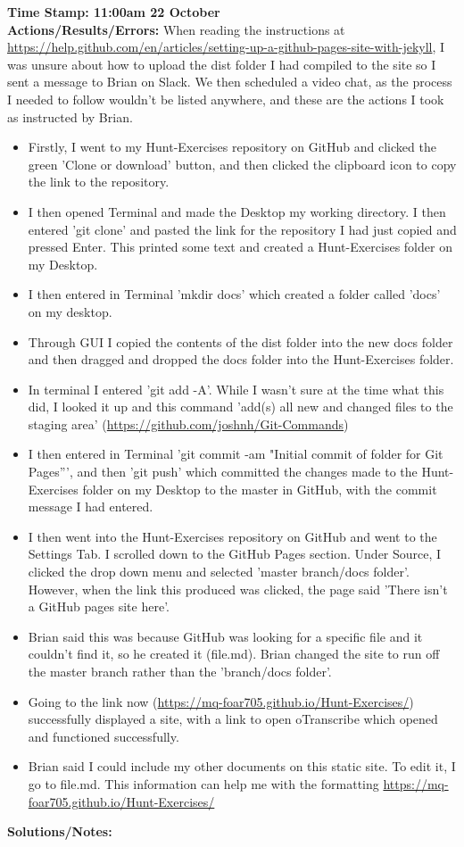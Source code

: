\documentclass{article}
\begin{document}
\begin{FlushLeft}
\textbf{Time Stamp: 11:00am 22 October} \\
\textbf{Actions/Results/Errors:} When reading the instructions at \url{https://help.github.com/en/articles/setting-up-a-github-pages-site-with-jekyll}, I was unsure about how to upload the dist folder I had compiled to the site so I sent a message to Brian on Slack. We then scheduled a video chat, as the process I needed to follow wouldn't be listed anywhere, and these are the actions I took as instructed by Brian.
\begin{itemize}
    \item Firstly, I went to my Hunt-Exercises repository on GitHub and clicked the green 'Clone or download' button, and then clicked the clipboard icon to copy the link to the repository.
    \item I then opened Terminal and made the Desktop my working directory. I then entered 'git clone' and pasted the link for the repository I had just copied and pressed Enter. This printed some text and created a Hunt-Exercises folder on my Desktop.
    \item I then entered in Terminal 'mkdir docs' which created a folder called 'docs' on my desktop.
    \item Through GUI I copied the contents of the dist folder into the new docs folder and then dragged and dropped the docs folder into the Hunt-Exercises folder.
    \item In terminal I entered 'git add -A'. While I wasn't sure at the time what this did, I looked it up and this command 'add(s) all new and changed files to the staging area' (\url{https://github.com/joshnh/Git-Commands})
    \item I then entered in Terminal 'git commit -am "Initial commit of folder for Git Pages”', and then 'git push' which committed the changes made to the Hunt-Exercises folder on my Desktop to the master in GitHub, with the commit message I had entered.
    \item I then went into the Hunt-Exercises repository on GitHub and went to the Settings Tab. I scrolled down to the GitHub Pages section. Under Source, I clicked the drop down menu and selected 'master branch/docs folder'. However, when the link this produced was clicked, the page said 'There isn’t a GitHub pages site here'.
    \item Brian said this was because GitHub was looking for a specific file and it couldn't find it, so he created it (file.md). Brian changed the site to run off the master branch rather than the 'branch/docs folder'.
    \item Going to the link now (\url{https://mq-foar705.github.io/Hunt-Exercises/}) successfully displayed a site, with a link to open oTranscribe which opened and functioned successfully.
    \item Brian said I could include my other documents on this static site. To edit it, I go to file.md. This information can help me with the formatting \url{https://mq-foar705.github.io/Hunt-Exercises/}
\end{itemize}
\textbf{Solutions/Notes:}\\
\vspace{5mm}


\end{FlushLeft}
\end{document}
